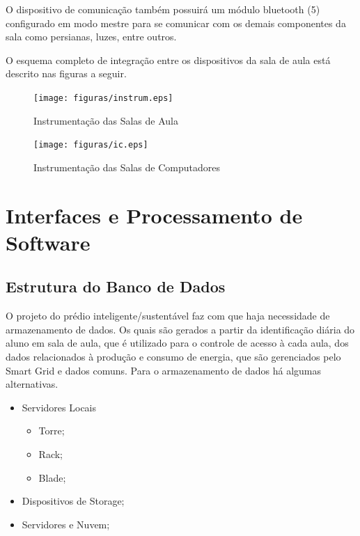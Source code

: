 O dispositivo de comunicação também possuirá um módulo bluetooth (5) configurado
em modo mestre para se comunicar com os demais componentes da sala como
persianas, luzes, entre outros.

O esquema completo de integração entre os dispositivos da sala de aula está
descrito nas figuras a seguir.

\begin{figure}[!h]
  \centering
  \texttt{[image: figuras/instrum.eps]}
  \caption{Instrumentação das Salas de Aula\label{fig:instrum}}
\end{figure}

\begin{figure}[!h]
  \centering
  \texttt{[image: figuras/ic.eps]}
  \caption{Instrumentação das Salas de Computadores\label{fig:ic}}
\end{figure}

\chapter[Interfaces e Processamento de Software]{Interfaces e Processamento de Software}

\section{Estrutura do Banco de Dados}

O projeto do prédio inteligente/sustentável faz com que haja necessidade de armazenamento de dados. Os quais são gerados a partir da identificação diária do aluno em sala de aula, que é utilizado para o controle de acesso à cada aula, dos dados relacionados à produção e consumo de energia, que são gerenciados pelo Smart Grid e dados comuns.
Para o armazenamento de dados há algumas alternativas.
\begin{itemize}
  \item Servidores Locais
    \begin{itemize}
    \item Torre;
    \item Rack;
    \item Blade;
    \end{itemize}
  \item Dispositivos de Storage;
  \item Servidores e Nuvem;
\end{itemize}

